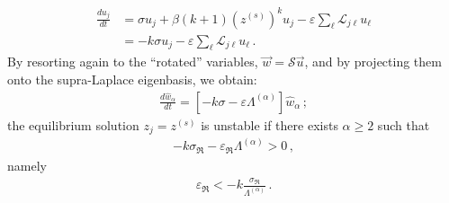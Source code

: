 \documentclass[aps,showpacs,preprintnumbers,amsmath,amssymb,twocolumn,superscriptaddress,floatfix,nofootinbib,10pt,pre]{revtex4-1}
\begin{document}
\begin{align}
\frac{du_j}{dt}&=\sigma u_j+\beta (k+1) (z^{(s)})^{k}u_j-\varepsilon \sum_\ell \mathcal{L}_{j\ell}u_\ell\nonumber\\
&= -k\sigma u_j-\varepsilon \sum_\ell \mathcal{L}_{j\ell}u_\ell\, .
\label{eq:modelklin}
\end{align}
By resorting again to the ``rotated'' variables, $\vec{w}=\mathcal{S}\vec{u}$, and by projecting them onto the supra-Laplace eigenbasis, we obtain:
\begin{align}
\label{eq:modelklinproj}
\frac{d\hat{w}_\alpha}{dt}= \left[-k\sigma-\varepsilon \Lambda^{(\alpha)}\right]\hat{w}_\alpha\, ;
\end{align}
the equilibrium solution $z_j=z^{(s)}$ is unstable if there exists $\alpha \geq 2$ such that 
\begin{align}
\label{eq:reldisp}
-k\sigma_{\Re}-\varepsilon_{\Re} \Lambda^{(\alpha)}>0\, ,
\end{align}
namely 
\begin{align}
\label{eq:reldisp2}
\varepsilon_{\Re} < -k\frac{\sigma_{\Re}}{\Lambda^{(\alpha)}}\, .
\end{align}
\end{document}
